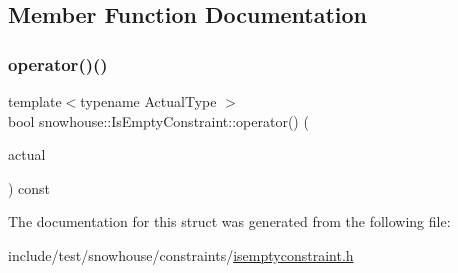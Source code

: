 \subsection{Member Function Documentation}
\mbox{\label{structsnowhouse_1_1IsEmptyConstraint_aa36286df70833fb33af6247c62dba704}} 
\subsubsection{\texorpdfstring{operator()()}{operator()()}}
{\footnotesize\ttfamily template$<$typename Actual\+Type $>$ \\
bool snowhouse\+::\+Is\+Empty\+Constraint\+::operator() (\begin{DoxyParamCaption}\item[{const Actual\+Type \&}]{actual }\end{DoxyParamCaption}) const\hspace{0.3cm}{\ttfamily [inline]}}



The documentation for this struct was generated from the following file\+:\begin{DoxyCompactItemize}
\item 
include/test/snowhouse/constraints/\mbox{\hyperlink{isemptyconstraint_8h}{isemptyconstraint.\+h}}\end{DoxyCompactItemize}
